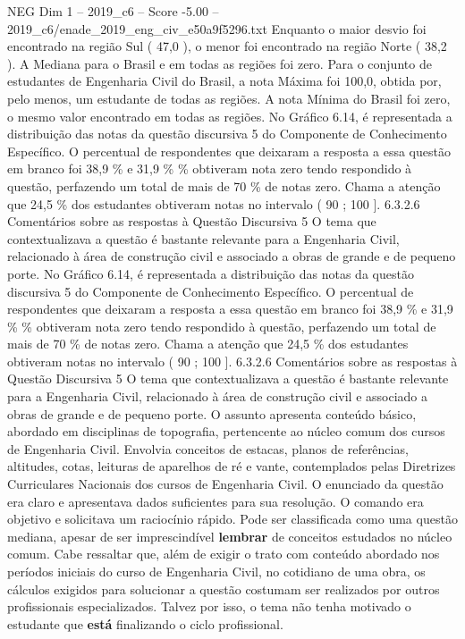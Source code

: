 \begin{textsample}{NEG Dim 1 – 2019\_c6 – Score -5.00 – 2019\_c6/enade\_2019\_eng\_civ\_e50a9f5296.txt}
Enquanto o maior desvio foi encontrado na região Sul ( 47,0 ), o menor foi encontrado na região Norte ( 38,2 ).
A Mediana para o Brasil e em todas as regiões foi zero.
Para o conjunto de estudantes de Engenharia Civil do Brasil, a nota Máxima foi 100,0, obtida por, pelo menos, um estudante de todas as regiões.
A nota Mínima do Brasil foi zero, o mesmo valor encontrado em todas as regiões.
No Gráfico 6.14, é representada a distribuição das notas da questão discursiva 5 do Componente de Conhecimento Específico.
O percentual de respondentes que deixaram a resposta a essa questão em branco foi 38,9 \% e 31,9 \% \% obtiveram nota zero tendo respondido à questão, perfazendo um total de mais de 70 \% de notas zero.
Chama a atenção que 24,5 \% dos estudantes obtiveram notas no intervalo ( 90 ; 100 ]. 6.3.2.6 Comentários sobre as respostas à Questão Discursiva 5 O tema que contextualizava a questão é bastante relevante para a Engenharia Civil, relacionado à área de construção civil e associado a obras de grande e de pequeno porte.
No Gráfico 6.14, é representada a distribuição das notas da questão discursiva 5 do Componente de Conhecimento Específico.
O percentual de respondentes que deixaram a resposta a essa questão em branco foi 38,9 \% e 31,9 \% \% obtiveram nota zero tendo respondido à questão, perfazendo um total de mais de 70 \% de notas zero.
Chama a atenção que 24,5 \% dos estudantes obtiveram notas no intervalo ( 90 ; 100 ]. 6.3.2.6 Comentários sobre as respostas à Questão Discursiva 5 O tema que contextualizava a questão é bastante relevante para a Engenharia Civil, relacionado à área de construção civil e associado a obras de grande e de pequeno porte.
O assunto apresenta conteúdo básico, abordado em disciplinas de topografia, pertencente ao núcleo comum dos cursos de Engenharia Civil.
Envolvia conceitos de estacas, planos de referências, altitudes, cotas, leituras de aparelhos de ré e vante, contemplados pelas Diretrizes Curriculares Nacionais dos cursos de Engenharia Civil.
O enunciado da questão era claro e apresentava dados suficientes para sua resolução.
O comando era objetivo e solicitava um raciocínio rápido.
Pode ser classificada como uma questão mediana, apesar de ser imprescindível \textbf{lembrar} de conceitos estudados no núcleo comum.
Cabe ressaltar que, além de exigir o trato com conteúdo abordado nos períodos iniciais do curso de Engenharia Civil, no cotidiano de uma obra, os cálculos exigidos para solucionar a questão costumam ser realizados por outros profissionais especializados.
Talvez por isso, o tema não tenha motivado o estudante que \textbf{está} finalizando o ciclo profissional.

\end{textsample}
